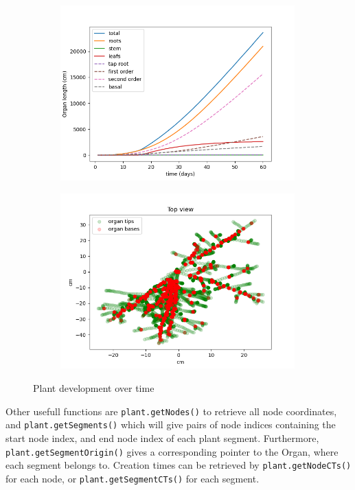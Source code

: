 \begin{figure}
\begin{subfigure}[c]{0.5\textwidth}
\includegraphics[width=0.99\textwidth]{examples/results/topics_development.png}
 \label{fig:topics_development}
\end{subfigure} 
\begin{subfigure}[c]{0.5\textwidth}
\includegraphics[width=0.99\textwidth]{examples/results/topics_development2.png}
 \label{fig:topics_development2}
\end{subfigure}
\caption{Plant development over time} 
\end{figure}

Other usefull functions are \texttt{plant.getNodes()} to retrieve all node coordinates, and \texttt{plant.getSegments()} which will give pairs of node indices containing the start node index, and end node index of each plant segment. Furthermore, \texttt{plant.getSegmentOrigin()} gives a corresponding pointer to the Organ, where each segment belongs to. Creation times can be retrieved by \texttt{plant.getNodeCTs()} for each node, or \texttt{plant.getSegmentCTs()} for each segment.
